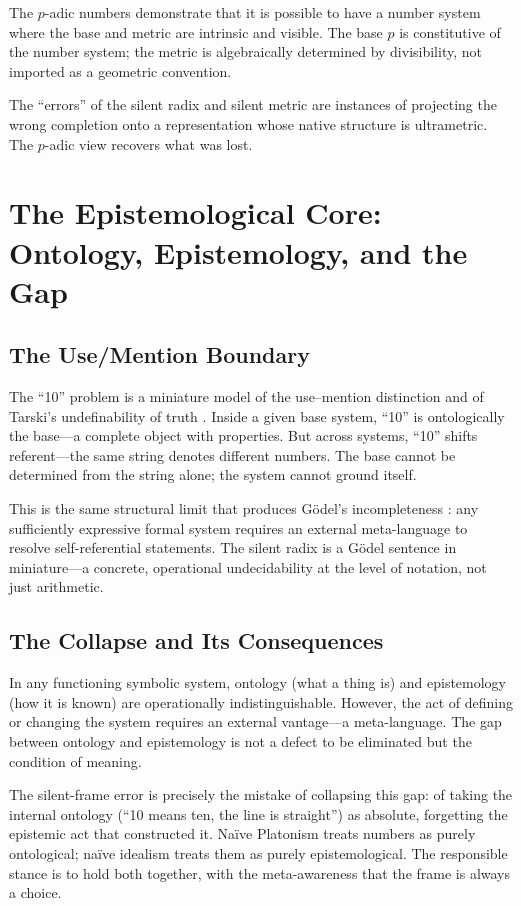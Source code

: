 \documentclass[12pt,a4paper]{article}
\theoremstyle{definition}
\theoremstyle{remark}
\begin{document}
The $p$-adic numbers demonstrate that it is possible to have a number system where the base and metric are intrinsic and visible. The base $p$ is constitutive of the number system; the metric is algebraically determined by divisibility, not imported as a geometric convention.

The ``errors'' of the silent radix and silent metric are instances of projecting the wrong completion onto a representation whose native structure is ultrametric. The $p$-adic view recovers what was lost.

\section{The Epistemological Core: Ontology, Epistemology, and the Gap}

\subsection{The Use/Mention Boundary}

The ``10'' problem is a miniature model of the use--mention distinction \cite{quine1940} and of Tarski's undefinability of truth \cite{tarski1933}. Inside a given base system, ``10'' is ontologically the base---a complete object with properties. But across systems, ``10'' shifts referent---the same string denotes different numbers. The base cannot be determined from the string alone; the system cannot ground itself.

This is the same structural limit that produces G\"odel's incompleteness \cite{godel1931}: any sufficiently expressive formal system requires an external meta-language to resolve self-referential statements. The silent radix is a G\"odel sentence in miniature---a concrete, operational undecidability at the level of notation, not just arithmetic.

\subsection{The Collapse and Its Consequences}

In any functioning symbolic system, ontology (what a thing is) and epistemology (how it is known) are operationally indistinguishable. However, the act of defining or changing the system requires an external vantage---a meta-language. The gap between ontology and epistemology is not a defect to be eliminated but the condition of meaning.

The silent-frame error is precisely the mistake of collapsing this gap: of taking the internal ontology (``10 means ten, the line is straight'') as absolute, forgetting the epistemic act that constructed it. Na\"ive Platonism treats numbers as purely ontological; na\"ive idealism treats them as purely epistemological. The responsible stance is to hold both together, with the meta-awareness that the frame is always a choice.
\end{document}
